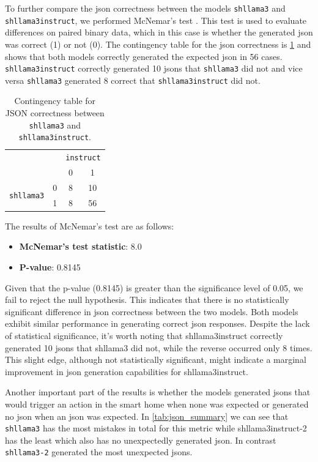 To further compare the \gls{json} correctness between the models \texttt{shllama3} and \texttt{shllama3instruct}, we performed McNemar's test \cite{sheskin2011handbook}. This test is used to evaluate differences on paired binary data, which in this case is whether the generated \gls{json} was correct (1) or not (0).
The contingency table for the \gls{json} correctness is \cref{tab:conti} and shows that both models correctly generated the expected \gls{json} in 56 cases. \texttt{shllama3instruct} correctly generated 10 \glspl{json} that \texttt{shllama3} did not and vice versa \texttt{shllama3} generated 8 correct that \texttt{shllama3instruct} did not.
\begin{table}[h]
    \centering
    \begin{tabular}{cc|c|c}
        & & \multicolumn{2}{c}{\texttt{instruct}} \\
        & & 0 & 1 \\ \hline
        \multirow{2}{*}{\texttt{shllama3}} & 0 & 8 & 10 \\ 
        & 1 & 8 & 56 \\ 
    \end{tabular}
    \caption{Contingency table for JSON correctness between \texttt{shllama3} and \texttt{shllama3instruct}.}
    \label{tab:conti}
\end{table}

The results of McNemar's test are as follows:
\begin{itemize}
    \item \textbf{McNemar's test statistic}: 8.0
    \item \textbf{P-value}: 0.8145
\end{itemize}
Given that the p-value (0.8145) is greater than the significance level of 0.05, we fail to reject the null hypothesis. This indicates that there is no statistically significant difference in \gls{json} correctness between the two models. Both models exhibit similar performance in generating correct \gls{json} responses.
Despite the lack of statistical significance, it's worth noting that shllama3instruct correctly generated 10 \glspl{json} that shllama3 did not, while the reverse occurred only 8 times. This slight edge, although not statistically significant, might indicate a marginal improvement in \gls{json} generation capabilities for shllama3instruct.

Another important part of the results is whether the models generated \glspl{json} that would trigger an action in the smart home when none was expected or generated no \gls{json} when an \gls{json} was expected.
In \cref{tab:json_summary} we can see that \texttt{shllama3} has the most mistakes in total for this metric while shllama3instruct-2 has the least which also has no unexpectedly generated \gls{json}.
In contrast \texttt{shllama3-2} generated the most unexpected \glspl{json}.

